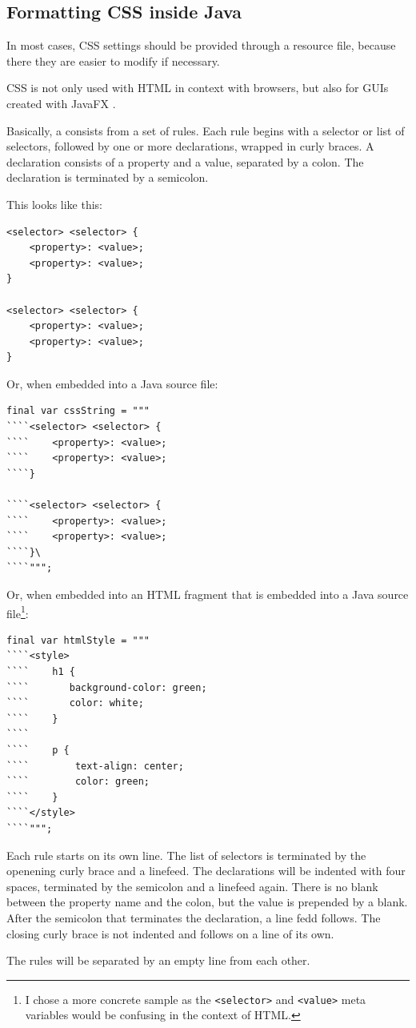 \subsection{Formatting CSS inside Java}\label{sec:FormattingCSSInsideJava}
In most cases, CSS \autocite{W3C:CSS} settings should be provided through a resource file, because there they are easier to modify if necessary.

CSS is not only used with HTML in context with browsers, but also for GUIs created with JavaFX \autocite{JavaFX}.

Basically, a  consists from a set of rules. Each rule begins with a selector or list of selectors, followed by one or more declarations, wrapped in curly braces. A declaration consists of a property and a value, separated by a colon. The declaration is terminated by a semicolon.

This looks like this:
\begin{lstlisting}[language={}]
<selector> <selector> {
    <property>: <value>;
    <property>: <value>;
}

<selector> <selector> {
    <property>: <value>;
    <property>: <value>;
}
\end{lstlisting}

Or, when embedded into a Java source file:
\begin{lstlisting}
final var cssString = """
````<selector> <selector> {
````    <property>: <value>;
````    <property>: <value>;
````}

````<selector> <selector> {
````    <property>: <value>;
````    <property>: <value>;
````}\
````""";
\end{lstlisting}

Or, when embedded into an HTML fragment that is embedded into a Java source file\footnote{I chose a more concrete sample as the \lstinline|<selector>| and \lstinline|<value>| meta variables would be confusing in the context of HTML.}:
\begin{lstlisting}
final var htmlStyle = """
````<style>
````    h1 { 
````       background-color: green;
````       color: white;
````    }
````
````    p {
````        text-align: center; 
````        color: green;
````    }
````</style>
````""";
\end{lstlisting}

Each rule starts on its own line. The list of selectors is terminated by the openening curly brace and a linefeed. The declarations will be indented with four spaces, terminated by the semicolon and a linefeed again. There is no blank between the property name and the colon, but the value is prepended by a blank. After the semicolon that terminates the declaration, a line fedd follows. The closing curly brace is not indented and follows on a line of its own.

The rules will be separated by an empty line from each other. 

